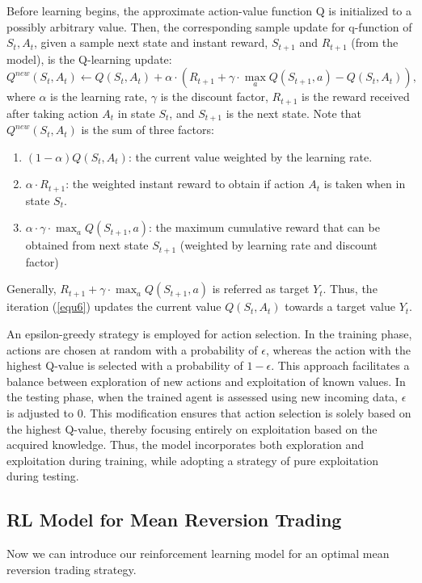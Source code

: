 \documentclass{article}
\begin{document}
Before learning begins, the approximate action-value function Q is initialized to a possibly arbitrary value. Then, the corresponding sample update for q-function of $S_t, A_t$, given a sample next state and instant reward, $S_{t+1}$ and $R_{t+1}$ (from the model), is the Q-learning update:
\begin{equation}\label{equ6}
    Q^{new}(S_t, A_t) \leftarrow Q(S_t, A_t) +\alpha \cdot \left(R_{t+1} + \gamma \cdot \max_a Q(S_{t+1}, a) - Q(S_t, A_t) \right),
\end{equation}
where $\alpha$ is the learning rate, $\gamma$ is the discount factor, $R_{t+1}$ is the reward received after taking action $A_t$ in state $S_t$, and $S_{t+1}$ is the next state. Note that $Q^{new}(S_t, A_t)$ is the sum of three factors:
\begin{enumerate}
    \item $(1-\alpha)Q(S_t,A_t)$: the current value weighted by the learning rate.
    \item $\alpha \cdot R_{t+1}$: the weighted instant reward to obtain if action $A_t$ is taken when in state $S_t$.
    \item $\alpha \cdot \gamma \cdot \max_a Q(S_{t+1}, a)$: the maximum cumulative reward that can be obtained from next state $S_{t+1}$ (weighted by learning rate and discount factor)
\end{enumerate}
Generally, $R_{t+1} + \gamma \cdot \max_a Q(S_{t+1}, a)$ is referred as target $Y_t$. Thus, the iteration (\ref{equ6}) updates the current value $Q(S_t, A_t)$ towards a target value $Y_t$. 

An epsilon-greedy strategy is employed for action selection. In the training phase, actions are chosen at random with a probability of $\epsilon$, whereas the action with the highest Q-value is selected with a probability of $1 - \epsilon$. This approach facilitates a balance between exploration of new actions and exploitation of known values. In the testing phase, when the trained agent is assessed using new incoming data, $\epsilon$ is adjusted to $0$. This modification ensures that action selection is solely based on the highest Q-value, thereby focusing entirely on exploitation based on the acquired knowledge. Thus, the model incorporates both exploration and exploitation during training, while adopting a strategy of pure exploitation during testing.

\subsection{RL Model for Mean Reversion Trading}
Now we can introduce our reinforcement learning model for an optimal mean reversion trading strategy.
\end{document}
